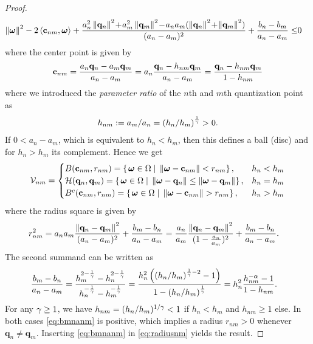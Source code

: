 \documentclass[12pt,onecolumn,journal,draftclsnofoot,letterpaper]{IEEEtran}
\renewcommand{\vp}{\mathbf q}
\newcommand{\HS}{\ensuremath{\mathcal{H}}}          %
\newcommand{\Vor}{\ensuremath{\mathcal{V}}}         %
\begin{document}
\begin{proof}
\begin{align*}
      \Norm{\vome}^2 -2 \skprod{\vc_{nm}}{\vome} + 
         \frac{a_n^2 \Norm{\vp_n}^2 \!+\!a_m^2 \Norm{\vp_m}^2 \!-\! a_na_m(\Norm{\vp_n}^2 \!+\!\Norm{\vp_m}^2)}{(a_n-a_m)^2} 
         + \frac{b_n-b_m}{a_n-a_m} \leq & 0
  \end{align*}
  where the center point is given by
  \begin{align}
    \vc_{nm}=\frac{a_n\vp_n- a_m\vp_m}{a_n-a_m}=a_n \frac{\vp_n-h_{nm} \vp_m}{a_n -a_m}=\frac{\vp_n -h_{nm}\vp_m}{1-h_{nm}} 
  \end{align}
  where we introduced the \emph{parameter ratio} of the $n$th and $m$th quantization point as
  \begin{align}
    h_{nm}:= a_m/a_n=\left(h_n /h_m\right)^{\frac{1}{\gamma}}>0.
  \end{align}
  If $0<a_n-a_m$, which is equivalent to $h_n<h_m$, then this defines a ball (disc) and for $h_n>h_m$ its complement. Hence we get
  \begin{align}
    \Vor_{nm}=\begin{cases}
      B(\vc_{nm},r_{nm})=\set{\vome\in\Omega}{\Norm{\vome-\vc_{nm}}    <  r_{nm}},&  h_n<h_m\\
      \HS(\vp_n,\vp_m) = \set{\vome\in\Omega}{ \Norm{\vome- \vp_n}\leq \Norm{\vome- \vp_m}}, &h_n=h_m\\
      B^c(\vc_{nm},r_{nm})=\set{\vome\in\Omega}{\Norm{\vome-\vc_{nm}}    >  r_{nm}},&  h_n >h_m
    \end{cases}
  \end{align}
  where the radius square is given by
  \begin{align}
    r_{nm}^2 
            &= a_na_m\frac{\Norm{\vp_n-\vp_m}^2}{(a_n-a_m)^2} + \frac{b_m-b_n}{a_n-a_m}=
            \frac{a_n}{a_m}\frac{\Norm{\vp_n-\vp_m}^2}{(1-\frac{a_n}{a_m})^2} +
            \frac{b_m-b_n}{a_n-a_m}\label{eq:radiusnm}.
  \end{align}
  The second summand can be written as
  \begin{align}
    \frac{b_m -b_n}{a_n -a_m} &
    = \frac{h_m^{2-\frac{1}{\gamma}} - h_n^{2-\frac{1}{\gamma}}}{h_n^{-\frac{1}{\gamma}}-h_m^{-\frac{1}{\gamma}}}
    = \frac{h_n^{2} \left(\left(h_n/h_m\right)^{\frac{1}{\gamma}-2} -1\right)}{1-\left(h_n/h_m\right)^{\frac{1}{\gamma}}} 
  = h_n^2 \frac{h_{nm}^{-\alpha} -1}{1-h_{nm}}
  \label{eq:bmnanm}.
  \end{align}
  For any $\gamma\geq 1$, we have $h_{nm}=(h_n/h_m)^{1/\gamma}< 1$ if $h_n<h_m$ and $h_{nm}\geq 1$ else.  In
  both cases \eqref{eq:bmnanm} is positive, which implies a radius
  $r_{nm}>0$ whenever $\vp_n\not=\vp_m$. Inserting \eqref{eq:bmnanm} in \eqref{eq:radiusnm} yields the result. 
\end{proof}
\end{document}
